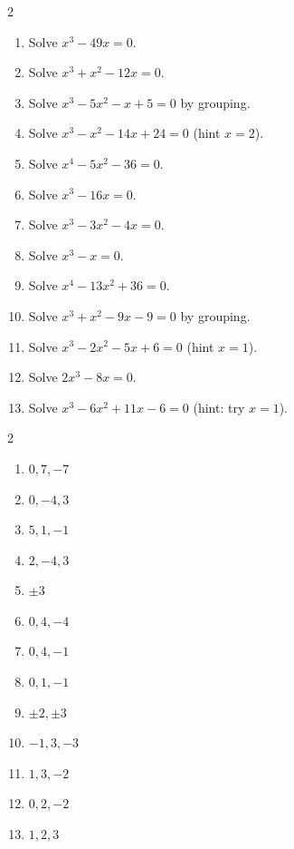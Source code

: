 \documentclass[11pt]{article}
\begin{document}
\clearpage
{}

\begin{recapbox}
\begin{multicols}{2}
\small
\begin{enumerate}[leftmargin=*,itemsep=3pt]
  \item Solve $x^3-49x=0$.
  \item Solve $x^3+x^2-12x=0$.
  \item Solve $x^3-5x^2-x+5=0$ by grouping.
  \item Solve $x^3-x^2-14x+24=0$ (hint $x=2$).
  \item Solve $x^4-5x^2-36=0$.
  \item Solve $x^3-16x=0$.
  \item Solve $x^3-3x^2-4x=0$.
  \item Solve $x^3-x=0$.
  \item Solve $x^4-13x^2+36=0$.
  \item Solve $x^3+x^2-9x-9=0$ by grouping.
  \item Solve $x^3-2x^2-5x+6=0$ (hint $x=1$).
  \item Solve $2x^3-8x=0$.
  \item Solve $x^3-6x^2+11x-6=0$ (hint: try $x=1$).
\end{enumerate}
\end{multicols}
\end{recapbox}

\begin{keybox}
\begin{multicols}{2}
\small
\begin{enumerate}[leftmargin=*,itemsep=3pt]
  \item $0,7,-7$
  \item $0,-4,3$
  \item $5,1,-1$
  \item $2,-4,3$
  \item $\pm3$
  \item $0,4,-4$
  \item $0,4,-1$
  \item $0,1,-1$
  \item $\pm2,\pm3$
  \item $-1,3,-3$
  \item $1,3,-2$
  \item $0,2,-2$
  \item $1,2,3$
\end{enumerate}
\end{multicols}
\end{keybox}
\end{document}
